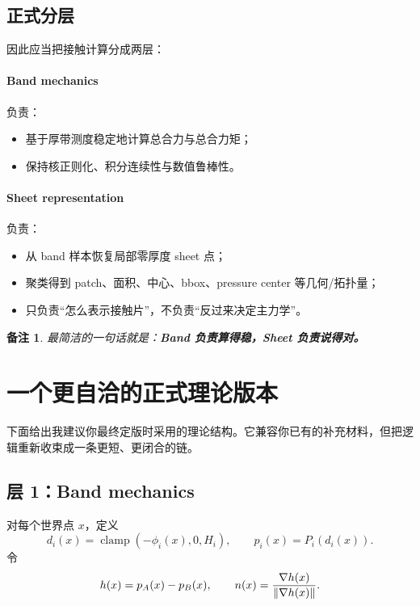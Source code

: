 \documentclass[12pt,a4paper]{ctexart}
\newtheorem{remark}{备注}
\begin{document}
\subsection{正式分层}
因此应当把接触计算分成两层：

\paragraph{Band mechanics} 负责：
\begin{itemize}
    \item 基于厚带测度稳定地计算总合力与总合力矩；
    \item 保持核正则化、积分连续性与数值鲁棒性。
\end{itemize}

\paragraph{Sheet representation} 负责：
\begin{itemize}
    \item 从 band 样本恢复局部零厚度 sheet 点；
    \item 聚类得到 patch、面积、中心、bbox、pressure center 等几何/拓扑量；
    \item 只负责“怎么表示接触片”，不负责“反过来决定主力学”。
\end{itemize}

\begin{remark}
最简洁的一句话就是：\textbf{Band 负责算得稳，Sheet 负责说得对。}
\end{remark}

\section{一个更自洽的正式理论版本}

下面给出我建议你最终定版时采用的理论结构。它兼容你已有的补充材料，但把逻辑重新收束成一条更短、更闭合的链。

\subsection{层 1：Band mechanics}
对每个世界点 $x$，定义
\begin{equation}
    d_i(x)=\operatorname{clamp}(-\phi_i(x),0,H_i),
    \qquad
    p_i(x)=P_i(d_i(x)).
\end{equation}
令
\begin{equation}
    h(x)=p_A(x)-p_B(x),
    \qquad
    n(x)=\frac{\nabla h(x)}{\norm{\nabla h(x)}}.
\end{equation}
\end{document}
